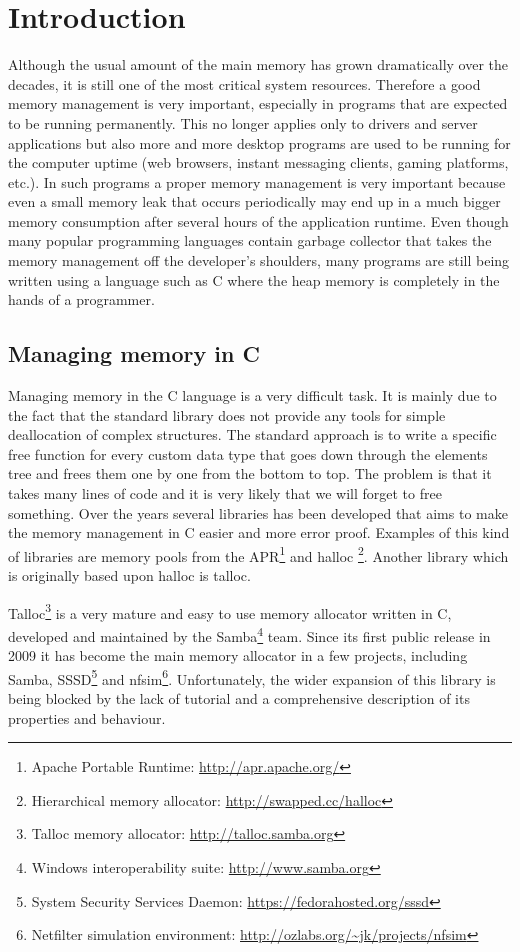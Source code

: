 \chapter{Introduction}

Although the usual amount of the main memory has grown dramatically over the
decades, it is still one of the most critical system resources. Therefore a good
memory management is very important, especially in programs that are expected to
be running permanently. This no longer applies only to drivers and server
applications but also more and more desktop programs are used to be running
for the computer uptime (web browsers, instant messaging clients, gaming
platforms, etc.). In such programs a proper memory management is very important
because even a small memory leak that occurs periodically may end up in a much
bigger memory consumption after several hours of the application runtime. Even
though many popular programming languages contain garbage collector that takes
the memory management off the developer's shoulders, many programs are still
being written using a language such as C where the heap memory is completely
in the hands of a programmer.

\section{Managing memory in C}

Managing memory in the C language is a very difficult task. It is mainly due to
the fact that the standard library does not provide any tools for simple
deallocation of complex structures. The standard approach is to write a
specific free function for every custom data type that goes down through the
elements tree and frees them one by one from the bottom to top. The problem is
that it takes many lines of code and it is very likely that we will forget to
free something. Over the years several libraries has been developed that aims
to make the memory management in C easier and more error proof. Examples of this
kind of libraries are memory pools from the APR\footnote{Apache Portable
Runtime: \url{http://apr.apache.org/}} and halloc \footnote{Hierarchical
memory allocator: \url{http://swapped.cc/halloc}}. Another library which is originally
based upon halloc is talloc.

Talloc\footnote{Talloc memory allocator: \url{http://talloc.samba.org}} is a
very mature and easy to use memory allocator written in C, developed and
maintained by the Samba\footnote{Windows interoperability suite:
\url{http://www.samba.org}} team. Since its first public release in 2009 it has
become the main memory allocator in a few projects, including Samba,
SSSD\footnote{System Security Services Daemon:
\url{https://fedorahosted.org/sssd}} and nfsim\footnote{Netfilter simulation
environment: \url{http://ozlabs.org/~jk/projects/nfsim}}. Unfortunately, the
wider expansion of this library is being blocked by the lack of tutorial and a
comprehensive description of its properties and behaviour.

